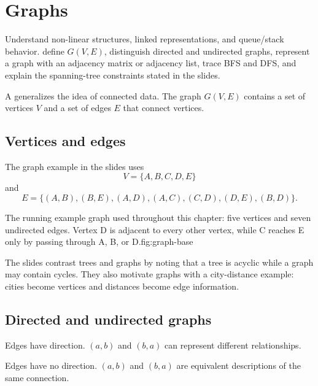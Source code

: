 \chapter{Graphs}\label{ch:graphs}

\chapterguide%
  {Understand non-linear structures, linked representations, and queue/stack behavior.}
  {define $G(V,E)$, distinguish directed and undirected graphs, represent a graph with an adjacency matrix or adjacency list, trace BFS and DFS, and explain the spanning-tree constraints stated in the slides.}

A  generalizes the idea of connected data. The graph $G(V,E)$ contains a set of vertices $V$ and a set of edges $E$ that connect vertices.

\section{Vertices and edges}

The graph example in the slides uses
\[
V=\{A,B,C,D,E\}
\]
and
\[
E=\{(A,B),(B,E),(A,D),(A,C),(C,D),(D,E),(B,D)\}.
\]

\begin{utpfig}{The running example graph used throughout this chapter: five vertices and
seven undirected edges. Vertex D is adjacent to every other vertex, while C reaches E only
by passing through A, B, or D.}{fig:graph-base}
\end{utpfig}

The slides contrast trees and graphs by noting that a tree is acyclic while a graph may contain cycles. They also motivate graphs with a city-distance example: cities become vertices and distances become edge information.

\section{Directed and undirected graphs}

\begin{description}[leftmargin=1.4in,style=nextline]
  \item[Directed graph] Edges have direction. $(a,b)$ and $(b,a)$ can represent different relationships.
  \item[Undirected graph] Edges have no direction. $(a,b)$ and $(b,a)$ are equivalent descriptions of the same connection.
\end{description}

